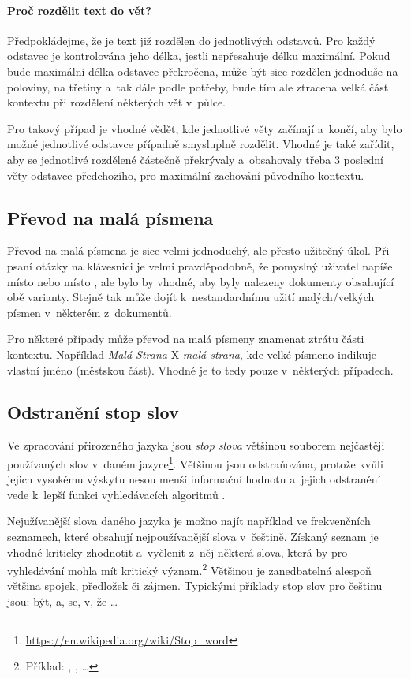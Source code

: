 \paragraph{Proč rozdělit text do vět?}
Předpokládejme, že je text již rozdělen do jednotlivých odstavců. Pro každý odstavec je kontrolována jeho délka, jestli nepřesahuje délku maximální. Pokud bude maximální délka odstavce překročena, může být sice rozdělen jednoduše na poloviny, na třetiny a~tak dále podle potřeby, bude tím ale ztracena velká část kontextu při rozdělení některých vět v~půlce.\par
Pro takový případ je vhodné vědět, kde jednotlivé věty začínají a~končí, aby bylo možné jednotlivé odstavce případně smysluplně rozdělit. Vhodné je také zařídit, aby se jednotlivé rozdělené  částečně překrývaly a~obsahovaly třeba 3 poslední věty odstavce předchozího, pro maximální zachování původního kontextu.

\subsection{Převod na malá písmena}
\label{prevod_na_mala}
Převod na malá písmena je sice velmi jednoduchý, ale přesto užitečný úkol. Při psaní otázky na klávesnici je velmi pravděpodobně, že pomyslný uživatel napíše  místo  nebo  místo , ale bylo by vhodné, aby byly nalezeny dokumenty obsahující obě varianty. Stejně tak může dojít k~nestandardnímu užití malých/velkých písmen v~některém z~dokumentů.\par
Pro některé případy může převod na malá písmeny znamenat ztrátu části kontextu. Například \emph{Malá Strana} X \emph{malá strana}, kde velké písmeno indikuje vlastní jméno (městskou část). Vhodné je to tedy pouze v~některých případech.

\subsection{Odstranění stop slov}
\label{stopwords}
Ve zpracování přirozeného jazyka jsou \emph{stop slova} většinou souborem nejčastěji používaných slov v~daném jazyce\footnote{\url{https://en.wikipedia.org/wiki/Stop_word}}. Většinou jsou odstraňována, protože kvůli jejich vysokému výskytu nesou menší informační hodnotu a~jejich odstranění vede k~lepší funkci vyhledávacích algoritmů \cite{bm25_improvements}.\par
Nejužívanější slova daného jazyka je možno najít například ve frekvenčních seznamech, které obsahují nejpoužívanější slova v~češtině. Získaný seznam je vhodné kriticky zhodnotit a~vyčlenit z~něj některá slova, která by pro vyhledávání mohla mít kritický význam.\footnote{Příklad: , ,  \dots} Většinou je zanedbatelná alespoň většina spojek, předložek či zájmen. Typickými příklady stop slov pro češtinu jsou: být, a, se, v, že \dots

